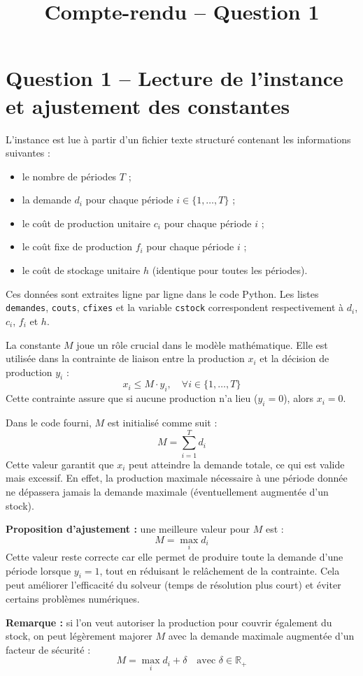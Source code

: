 \documentclass[a4paper,11pt]{article}
\title{Compte-rendu -- Question 1}
\author{}
\date{}
\begin{document}
\maketitle

\section*{Question 1 -- Lecture de l'instance et ajustement des constantes}

L’instance est lue à partir d’un fichier texte structuré contenant les informations suivantes :
\begin{itemize}
    \item le nombre de périodes $T$ ;
    \item la demande $d_i$ pour chaque période $i \in \{1, \dots, T\}$ ;
    \item le coût de production unitaire $c_i$ pour chaque période $i$ ;
    \item le coût fixe de production $f_i$ pour chaque période $i$ ;
    \item le coût de stockage unitaire $h$ (identique pour toutes les périodes).
\end{itemize}

Ces données sont extraites ligne par ligne dans le code Python. Les listes \texttt{demandes}, \texttt{couts}, \texttt{cfixes} et la variable \texttt{cstock} correspondent respectivement à $d_i$, $c_i$, $f_i$ et $h$.

\medskip

La constante $M$ joue un rôle crucial dans le modèle mathématique. Elle est utilisée dans la contrainte de liaison entre la production $x_i$ et la décision de production $y_i$ :
\[
x_i \leq M \cdot y_i, \quad \forall i \in \{1, \dots, T\}
\]
Cette contrainte assure que si aucune production n’a lieu ($y_i = 0$), alors $x_i = 0$.

\medskip

Dans le code fourni, $M$ est initialisé comme suit :
\[
M = \sum_{i=1}^{T} d_i
\]
Cette valeur garantit que $x_i$ peut atteindre la demande totale, ce qui est valide mais excessif. En effet, la production maximale nécessaire à une période donnée ne dépassera jamais la demande maximale (éventuellement augmentée d’un stock).

\medskip

\textbf{Proposition d’ajustement :} une meilleure valeur pour $M$ est :
\[
M = \max_{i} d_i
\]
Cette valeur reste correcte car elle permet de produire toute la demande d’une période lorsque $y_i = 1$, tout en réduisant le relâchement de la contrainte. Cela peut améliorer l’efficacité du solveur (temps de résolution plus court) et éviter certains problèmes numériques.

\medskip

\textbf{Remarque :} si l’on veut autoriser la production pour couvrir également du stock, on peut légèrement majorer $M$ avec la demande maximale augmentée d’un facteur de sécurité :
\[
M = \max_i d_i + \delta
\quad \text{avec } \delta \in \mathbb{R}_+
\]
\end{document}

